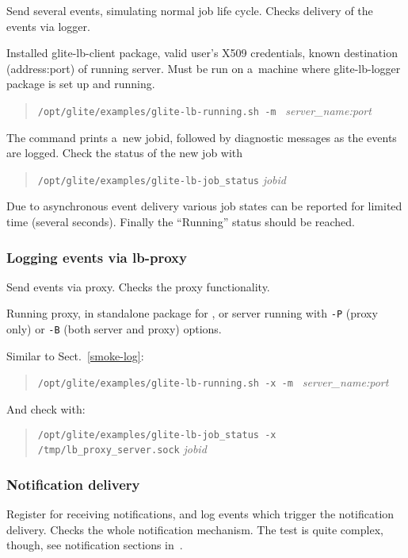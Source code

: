 \label{smoke-log}

Send several \LB events, simulating normal job life cycle.
Checks delivery of the events via \LB logger.

\req Installed glite-lb-client package, valid user's X509 credentials,
known destination (address:port) of running \LB server.
Must be run on a~machine where glite-lb-logger package is set up and running.

\how
\begin{quote}
\verb'/opt/glite/examples/glite-lb-running.sh -m ' \emph{server\_name:port}
\end{quote}

The command prints a~new jobid, followed by diagnostic messages as the events are logged. 
Check the status of the new job with
\begin{quote}
\verb'/opt/glite/examples/glite-lb-job_status' \emph{jobid}
\end{quote}

\result
Due to asynchronous event
delivery various job states can be reported for limited time (several seconds).
Finally the
``Running'' status should be reached.

\subsubsection{Logging events via lb-proxy}

Send events via \LB proxy. Checks the proxy functionality.

\req Running \LB proxy, in standalone package for \LBold, or
\LB server running with \verb'-P' (proxy only) or \verb'-B' (both server and proxy)
options.

\how Similar to Sect.~\ref{smoke-log}:
\begin{quote}
\verb'/opt/glite/examples/glite-lb-running.sh -x -m ' \emph{server\_name:port}
\end{quote}

And check with:
\begin{quote}
\verb'/opt/glite/examples/glite-lb-job_status -x /tmp/lb_proxy_server.sock' \emph{jobid}
\end{quote}


\subsubsection{Notification delivery}

Register for receiving notifications, and log events which trigger
the notification delivery. Checks the whole notification mechanism.
The test is quite complex, though, see notification sections in~\cite{lbug,lbtp}.
